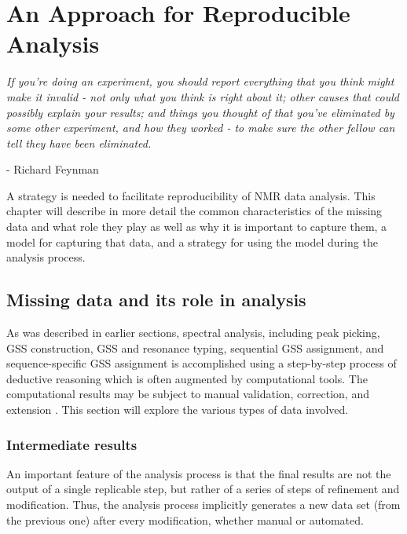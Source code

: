 \chapter{An Approach for Reproducible Analysis}

\begin{center}
  \textit{If you're doing an experiment, you should report everything that 
    you think might make it invalid - not only what you think is right about it; 
    other causes that could possibly explain your results; and things you 
    thought of that you've eliminated by some other experiment, and how they 
    worked - to make sure the other fellow can tell they have been eliminated.}

 - Richard Feynman
\end{center}



A strategy is needed to facilitate reproducibility of NMR data analysis.
This chapter will describe in more detail the common characteristics of
the missing data and what role they play as well as why it is important to
capture them, a model for capturing that data, and a strategy for using
the model during the analysis process.


\section{Missing data and its role in analysis}

As was described in earlier sections, 
spectral analysis, including peak picking, GSS construction, GSS and resonance
typing, sequential GSS assignment, and sequence-specific GSS assignment is 
accomplished using a step-by-step process of deductive reasoning 
which is often augmented by computational tools.  The computational 
results may be subject to manual validation, correction, and extension
\cite{guerry2011automated}.  This section will explore the various types
of data involved.

\subsection{Intermediate results}
An important feature of the analysis process is that the final results are
not the output of a single replicable step, but rather of a series of steps
of refinement and modification.  Thus, the analysis process implicitly 
generates a new data set (from the previous one) after every modification, 
whether manual or automated.

